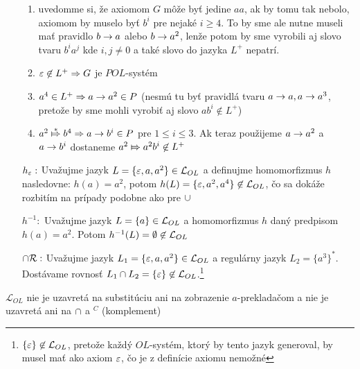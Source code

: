 \begin{dokaz}
\begin{itemize}
        \begin{enumerate}
        \item uvedomme si, že axiomom $G$ môže byť jedine $aa$, ak by tomu
            tak nebolo, axiomom by muselo byť $b^{i}$ pre nejaké $i\geq4$.
            To by sme ale nutne museli mať pravidlo $b\rightarrow a$ alebo 
            $b\rightarrow a^2$, lenže potom by sme vyrobili aj slovo tvaru 
            $b^i a^j$ kde  $i,j\neq0$ a  také slovo do jazyka $L^{+}$
            nepatrí.
        \item $\varepsilon \not \in L^{+} \Rightarrow G$ je $POL$-systém

        \item $a^4 \in L^{+} \Rightarrow a\rightarrow a^2\in P$ (nesmú tu byť
            pravidlá tvaru $a\rightarrow a,a\rightarrow a^3$,
            pretože by sme mohli vyrobiť
            aj slovo $ab^{i}\not\in L^{+}$)

        \item $a^2 \overset{*}{\Mapsto} b^4 \Rightarrow a\rightarrow b^{i}\in P$ 
            pre $1\le i\le 3$. Ak teraz použijeme 
            $a\rightarrow a^2$ a $a\rightarrow b^{i}$ dostaneme 
            $a^2 \Mapsto a^2 b^i \not\in L^{+}$
        \end{enumerate}

    \item[$h_{\varepsilon}:$] Uvažujme jazyk
        $L=\{\varepsilon,a,a^2\}\in \mathcal{L}_{OL}$ a definujme
        homomorfizmus $h$ nasledovne: $h(a)=a^2$, potom
        $h(L)=\{\varepsilon,a^2,a^4\} \not \in \mathcal{L}_{OL}$, čo sa
        dokáže rozbitím na prípady podobne ako pre $\cup$

    \item[$h^{-1}:$] Uvažujme jazyk $L=\{a\}\in \mathcal{L}_{OL}$ a
        homomorfizmus $h$ daný predpisom $h(a)=a^2$. Potom
        $h^{-1}(L)=\emptyset \not\in \mathcal{L}_{OL}$

    \item[$\cap\mathcal{R} :$] Uvažujme jazyk
        $L_1=\{\varepsilon,a,a^2\} \in \mathcal{L}_{OL}$ a regulárny
        jazyk $L_2=\{a^3\}^{*}$.
        Dostávame rovnosť $L_1 \cap
        L_2 =\{\varepsilon\}\not\in \mathcal{L}_{OL}$.\footnote{
            $\{\varepsilon\}\not\in\mathcal{L}_{OL}$, pretože každý
            $OL$-systém, ktorý by tento jazyk generoval, by musel mať ako
            axiom $\varepsilon$, čo je z definície axiomu nemožné}
    \end{itemize}
\end{dokaz}

\begin{dosledok}
    $\mathcal{L}_{OL}$ nie je uzavretá na substitúciu ani na
    zobrazenie $a$-prekladačom a nie je uzavretá ani na $\cap$ a
    $^{C}$ (komplement)
\end{dosledok}

